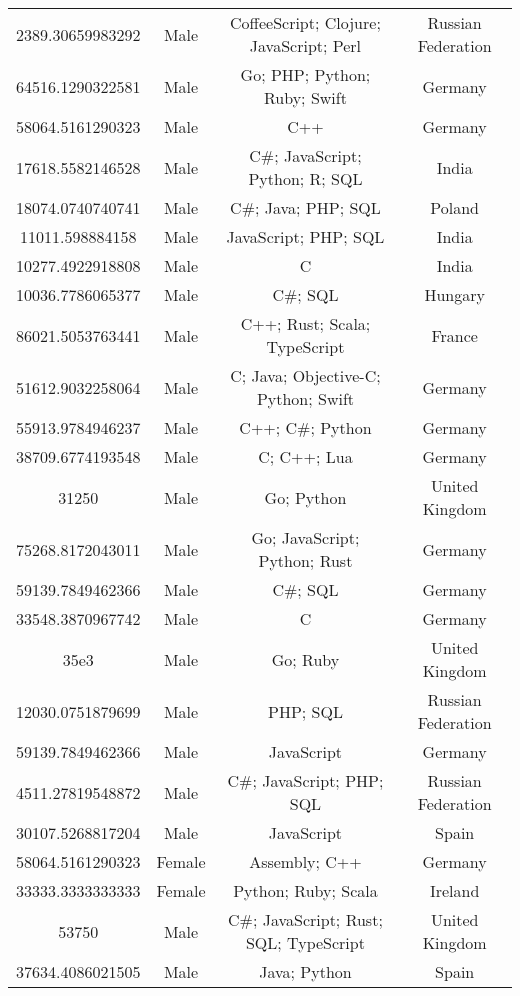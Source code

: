 \begin{center}
\begin{tabular}{ |c|c|c|c| }
2389.30659983292  &  Male  &  CoffeeScript; Clojure; JavaScript; Perl  &  Russian Federation  \\ 
64516.1290322581  &  Male  &  Go; PHP; Python; Ruby; Swift  &  Germany  \\ 
58064.5161290323  &  Male  &  C++  &  Germany  \\ 
17618.5582146528  &  Male  &  C\#; JavaScript; Python; R; SQL  &  India  \\ 
18074.0740740741  &  Male  &  C\#; Java; PHP; SQL  &  Poland  \\ 
11011.598884158  &  Male  &  JavaScript; PHP; SQL  &  India  \\ 
10277.4922918808  &  Male  &  C  &  India  \\ 
10036.7786065377  &  Male  &  C\#; SQL  &  Hungary  \\ 
86021.5053763441  &  Male  &  C++; Rust; Scala; TypeScript  &  France  \\ 
51612.9032258064  &  Male  &  C; Java; Objective-C; Python; Swift  &  Germany  \\ 
55913.9784946237  &  Male  &  C++; C\#; Python  &  Germany  \\ 
38709.6774193548  &  Male  &  C; C++; Lua  &  Germany  \\ 
31250  &  Male  &  Go; Python  &  United Kingdom  \\ 
75268.8172043011  &  Male  &  Go; JavaScript; Python; Rust  &  Germany  \\ 
59139.7849462366  &  Male  &  C\#; SQL  &  Germany  \\ 
33548.3870967742  &  Male  &  C  &  Germany  \\ 
35e3  &  Male  &  Go; Ruby  &  United Kingdom  \\ 
12030.0751879699  &  Male  &  PHP; SQL  &  Russian Federation  \\ 
59139.7849462366  &  Male  &  JavaScript  &  Germany  \\ 
4511.27819548872  &  Male  &  C\#; JavaScript; PHP; SQL  &  Russian Federation  \\ 
30107.5268817204  &  Male  &  JavaScript  &  Spain  \\ 
58064.5161290323  &  Female  &  Assembly; C++  &  Germany  \\ 
33333.3333333333  &  Female  &  Python; Ruby; Scala  &  Ireland  \\ 
53750  &  Male  &  C\#; JavaScript; Rust; SQL; TypeScript  &  United Kingdom  \\ 
37634.4086021505  &  Male  &  Java; Python  &  Spain  \\ 

\end{tabular}
\end{center}
